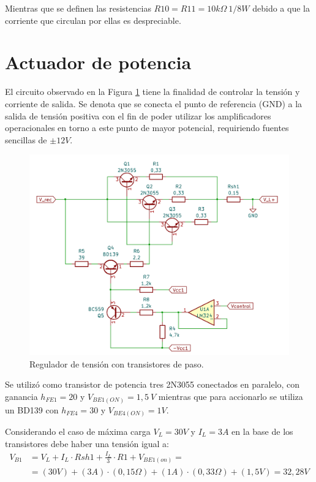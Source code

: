 Mientras que se definen las resistencias $R10=R11=10 k\Omega \ 1/8W$ debido a que la corriente que circulan por ellas es despreciable.\par 

\section{Actuador de potencia} \par 

El circuito observado en la Figura \ref{F:Circuito_Actuador} tiene la finalidad de controlar la tensión y corriente de salida. Se denota que se conecta el punto de referencia (GND) a la salida de tensión positiva con el fin de poder utilizar los amplificadores operacionales en torno a este punto de mayor potencial, requiriendo fuentes sencillas de $\pm12V$.

\begin{figure} [H]
	\centering
	\includegraphics[width=\textwidth]{./imagenes/Circuito_actuador.png}
	\caption{Regulador de tensión con transistores de paso.}
	\label{F:Circuito_Actuador}
\end{figure} \par 

Se utilizó como transistor de potencia tres 2N3055 conectados en paralelo, con ganancia $h_{FE1} =20$ y $V_{BE1(ON)} =1,5~V$ mientras que para accionarlo se utiliza un BD139 con $h_{FE4} =30$ y $V_{BE4(ON)} =1V$. \par 
Considerando el caso de máxima carga $V_L =30V$ y $I_L =3A$ en la base de los transistores debe haber una tensión igual a:
\begin{equation}
\begin{split}
V_{B1}&=V_L+I_L\cdot Rsh1+\frac{I_L}{3}\cdot R1+V_{BE1(on)}= \\
&=(30V)+(3A)\cdot (0,15\Omega)+(1A)\cdot (0,33\Omega)+(1,5V)=32,28V
\end{split}
\end{equation} \par 


